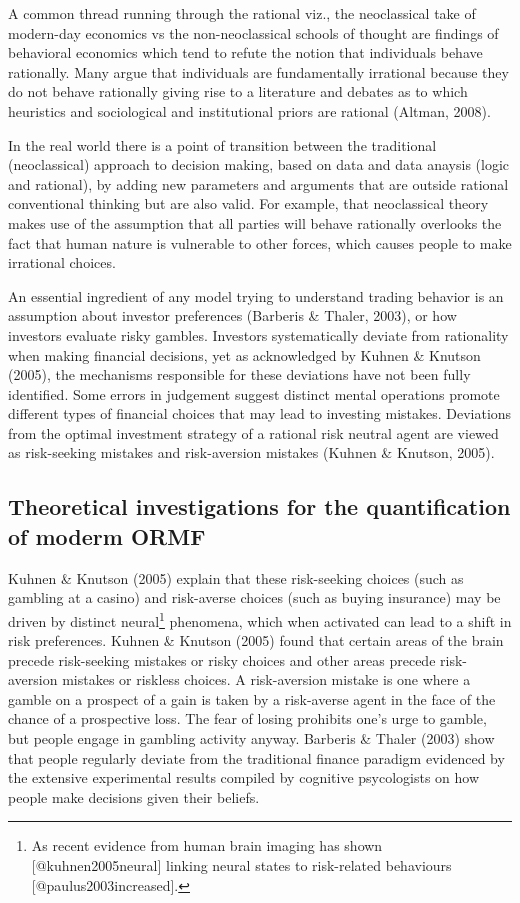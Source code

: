 \documentclass{DissertateUSU}
\begin{document}
A common thread running through the rational viz., the neoclassical take
of modern-day economics vs the non-neoclassical schools of thought are
findings of behavioral economics which tend to refute the notion that
individuals behave rationally. Many argue that individuals are
fundamentally irrational because they do not behave rationally giving
rise to a literature and debates as to which heuristics and sociological
and institutional priors are rational (Altman, 2008).\medskip

In the real world there is a point of transition between the traditional
(neoclassical) approach to decision making, based on data and data
anaysis (logic and rational), by adding new parameters and arguments
that are outside rational conventional thinking but are also valid. For
example, that neoclassical theory makes use of the assumption that all
parties will behave rationally overlooks the fact that human nature is
vulnerable to other forces, which causes people to make irrational
choices.\medskip 

An essential ingredient of any model trying to understand trading
behavior is an assumption about investor preferences (Barberis \&
Thaler, 2003), or how investors evaluate risky gambles. Investors
systematically deviate from rationality when making financial decisions,
yet as acknowledged by Kuhnen \& Knutson (2005), the mechanisms
responsible for these deviations have not been fully identified. Some
errors in judgement suggest distinct mental operations promote different
types of financial choices that may lead to investing mistakes.
Deviations from the optimal investment strategy of a rational risk
neutral agent are viewed as risk-seeking mistakes and risk-aversion
mistakes (Kuhnen \& Knutson, 2005).\medskip 

\subsection{Theoretical investigations for the quantification of moderm ORMF}

Kuhnen \& Knutson (2005) explain that these risk-seeking choices (such
as gambling at a casino) and risk-averse choices (such as buying
insurance) may be driven by distinct
neural\footnote{As recent evidence from human brain imaging has shown [@kuhnen2005neural] linking neural states to risk-related behaviours [@paulus2003increased].}
phenomena, which when activated can lead to a shift in risk preferences.
Kuhnen \& Knutson (2005) found that certain areas of the brain precede
risk-seeking mistakes or risky choices and other areas precede
risk-aversion mistakes or riskless choices. A risk-aversion mistake is
one where a gamble on a prospect of a gain is taken by a risk-averse
agent in the face of the chance of a prospective loss. The fear of
losing prohibits one's urge to gamble, but people engage in gambling
activity anyway. Barberis \& Thaler (2003) show that people regularly
deviate from the traditional finance paradigm evidenced by the extensive
experimental results compiled by cognitive psycologists on how people
make decisions given their beliefs.\medskip 
\end{document}
